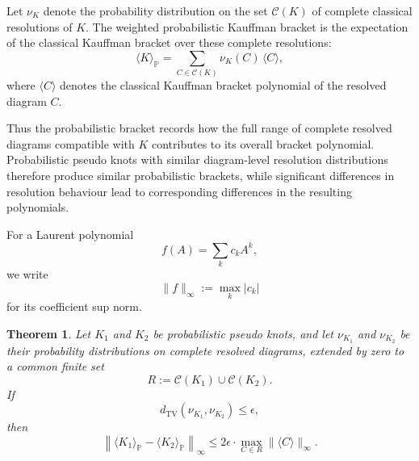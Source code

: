 \documentclass[a4paper, reqno, 12pt]{amsart}
\theoremstyle{plain}
\newtheorem{theorem}{Theorem}[section]
\theoremstyle{definition}
\begin{document}
\smallbreak

\begin{center}
\end{center}

\smallbreak

Let \(\nu_K\) denote the probability distribution on the set \(\mathcal C(K)\) of complete classical resolutions of \(K\). The weighted probabilistic Kauffman bracket is the expectation of the classical Kauffman bracket over these complete resolutions:
\[
\langle K\rangle_{\mathbb P}
=
\sum_{C\in\mathcal C(K)}
\nu_K(C)\,\langle C\rangle,
\]
where \(\langle C\rangle\) denotes the classical Kauffman bracket polynomial of the resolved diagram \(C\).

Thus the probabilistic bracket records how the full range of complete resolved diagrams compatible with \(K\) contributes to its overall bracket polynomial. Probabilistic pseudo knots with similar diagram-level resolution distributions therefore produce similar probabilistic brackets, while significant differences in resolution behaviour lead to corresponding differences in the resulting polynomials.

For a Laurent polynomial
\[
f(A)=\sum_k c_kA^k,
\]
we write
\[
\|f\|_\infty:=\max_k |c_k|
\]
for its coefficient sup norm.

\begin{theorem}\label{thm:bracket_diff_bound}
Let \(K_1\) and \(K_2\) be probabilistic pseudo knots, and let \(\nu_{K_1}\) and \(\nu_{K_2}\) be their probability distributions on complete resolved diagrams, extended by zero to a common finite set
\[
R:=\mathcal C(K_1)\cup \mathcal C(K_2).
\]
If
\[
d_{\mathrm{TV}}(\nu_{K_1},\nu_{K_2})\le \epsilon,
\]
then
\[
\left\|
\langle K_1\rangle_{\mathbb P}
-
\langle K_2\rangle_{\mathbb P}
\right\|_\infty
\le
2\epsilon
\cdot
\max_{C\in R}
\|\langle C\rangle\|_\infty .
\]
\end{theorem}
\end{document}
